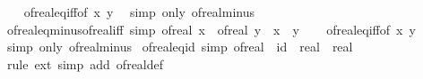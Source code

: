\begin{isabellebody}
%
\isadelimproof
\ \ %
\endisadelimproof
%
\isatagproof
{}\isamarkupfalse%
\ of{\isacharunderscore}{\kern0pt}real{\isacharunderscore}{\kern0pt}eq{\isacharunderscore}{\kern0pt}iff{\isacharbrackleft}{\kern0pt}of\ {\isachardoublequoteopen}{\isacharminus}{\kern0pt}x{\isachardoublequoteclose}\ y{\isacharbrackright}{\kern0pt}\ \isamarkupfalse%
\ {\isacharparenleft}{\kern0pt}simp\ only{\isacharcolon}{\kern0pt}\ of{\isacharunderscore}{\kern0pt}real{\isacharunderscore}{\kern0pt}minus{\isacharparenright}{\kern0pt}%
\endisatagproof
{\isafoldproof}%
%
\isadelimproof
\isanewline
%
\endisadelimproof
\isanewline
{}\isamarkupfalse%
\ of{\isacharunderscore}{\kern0pt}real{\isacharunderscore}{\kern0pt}eq{\isacharunderscore}{\kern0pt}minus{\isacharunderscore}{\kern0pt}of{\isacharunderscore}{\kern0pt}real{\isacharunderscore}{\kern0pt}iff\ {\isacharbrackleft}{\kern0pt}simp{\isacharbrackright}{\kern0pt}{\isacharcolon}{\kern0pt}\ {\isachardoublequoteopen}of{\isacharunderscore}{\kern0pt}real\ x\ {\isacharequal}{\kern0pt}\ {\isacharminus}{\kern0pt}of{\isacharunderscore}{\kern0pt}real\ y\ {\isasymlongleftrightarrow}\ x\ {\isacharequal}{\kern0pt}\ {\isacharminus}{\kern0pt}y{\isachardoublequoteclose}\isanewline
%
\isadelimproof
\ \ %
\endisadelimproof
%
\isatagproof
{}\isamarkupfalse%
\ of{\isacharunderscore}{\kern0pt}real{\isacharunderscore}{\kern0pt}eq{\isacharunderscore}{\kern0pt}iff{\isacharbrackleft}{\kern0pt}of\ x\ {\isachardoublequoteopen}{\isacharminus}{\kern0pt}y{\isachardoublequoteclose}{\isacharbrackright}{\kern0pt}\ \isamarkupfalse%
\ {\isacharparenleft}{\kern0pt}simp\ only{\isacharcolon}{\kern0pt}\ of{\isacharunderscore}{\kern0pt}real{\isacharunderscore}{\kern0pt}minus{\isacharparenright}{\kern0pt}%
\endisatagproof
{\isafoldproof}%
%
\isadelimproof
\isanewline
%
\endisadelimproof
\isanewline
{}\isamarkupfalse%
\ of{\isacharunderscore}{\kern0pt}real{\isacharunderscore}{\kern0pt}eq{\isacharunderscore}{\kern0pt}id\ {\isacharbrackleft}{\kern0pt}simp{\isacharbrackright}{\kern0pt}{\isacharcolon}{\kern0pt}\ {\isachardoublequoteopen}of{\isacharunderscore}{\kern0pt}real\ {\isacharequal}{\kern0pt}\ {\isacharparenleft}{\kern0pt}id\ {\isacharcolon}{\kern0pt}{\isacharcolon}{\kern0pt}\ real\ {\isasymRightarrow}\ real{\isacharparenright}{\kern0pt}{\isachardoublequoteclose}\isanewline
%
\isadelimproof
\ \ %
\endisadelimproof
%
\isatagproof
{}\isamarkupfalse%
\ {\isacharparenleft}{\kern0pt}rule\ ext{\isacharparenright}{\kern0pt}\ {\isacharparenleft}{\kern0pt}simp\ add{\isacharcolon}{\kern0pt}\ of{\isacharunderscore}{\kern0pt}real{\isacharunderscore}{\kern0pt}def{\isacharparenright}{\kern0pt}%

\end{isabellebody}
